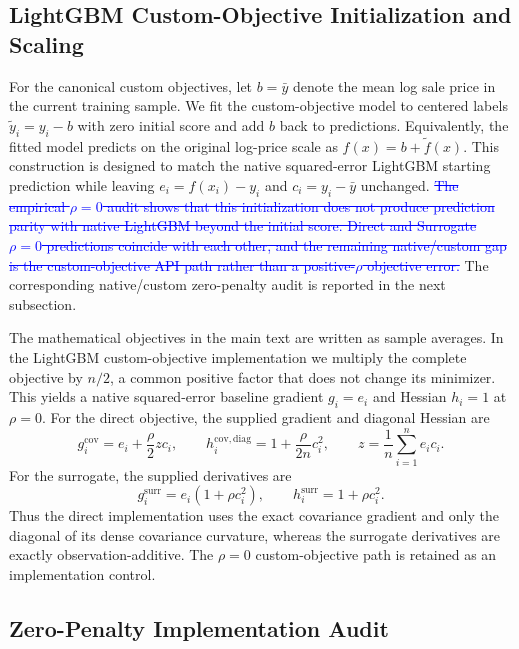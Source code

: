 \documentclass[10pt]{article}
\theoremstyle{definition}
\newcommand{\1}{\mathbf{1}}
\newcommand{\oldtext}[1]{\textcolor{blue}{\sout{#1}}}
\newcommand{\newtext}[1]{\textcolor{impGreen}{#1}}
\begin{document}
\subsection{LightGBM Custom-Objective Initialization and Scaling}

For the canonical custom objectives, let $b=\bar y$ denote the mean log sale price
in the current training sample. We fit the custom-objective model to centered labels
$\widetilde y_i=y_i-b$ with zero initial score and add $b$ back to predictions.
Equivalently, the fitted model predicts on the original log-price scale as
$f(x)=b+\widetilde f(x)$. 
\newtext{This construction is designed to match the native squared-error LightGBM starting prediction while leaving $e_i=f(x_i)-y_i$ and $c_i=y_i-\bar y$ unchanged.}
\oldtext{The empirical $\rho=0$ audit shows that this initialization does not produce prediction parity with native LightGBM beyond the initial score. Direct and Surrogate $\rho=0$ predictions coincide with each other, and the remaining native/custom gap is the custom-objective API path rather than a positive-$\rho$ objective error.}
\newtext{The corresponding native/custom zero-penalty audit is reported in the next subsection.}

The mathematical objectives in the main text are written as sample averages. In
the LightGBM custom-objective implementation we multiply the complete objective by
$n/2$, a common positive factor that does not change its minimizer. This yields a
native squared-error baseline gradient $g_i=e_i$ and Hessian $h_i=1$ at $\rho=0$.
For the direct objective, the supplied gradient and diagonal Hessian are
\[
g_i^{\mathrm{cov}}
=
e_i+\frac{\rho}{2}z c_i,
\qquad
h_i^{\mathrm{cov,diag}}
=
1+\frac{\rho}{2n}c_i^2,
\qquad
z=\frac{1}{n}\sum_{i=1}^n e_i c_i.
\]
For the surrogate, the supplied derivatives are
\[
g_i^{\mathrm{surr}}=e_i(1+\rho c_i^2),
\qquad
h_i^{\mathrm{surr}}=1+\rho c_i^2.
\]
Thus the direct implementation uses the exact covariance gradient and only the
diagonal of its dense covariance curvature, whereas the surrogate derivatives are
exactly observation-additive. The $\rho=0$ custom-objective path is retained as an
implementation control.

\subsection{\newtext{Zero-Penalty Implementation Audit}}
\label{subsec:zero_control_results}
\end{document}
